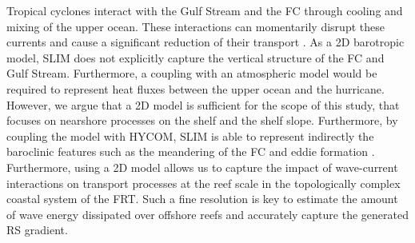 Tropical cyclones interact with the Gulf Stream and the FC through cooling and mixing of the upper ocean. These interactions can momentarily disrupt these currents and cause a significant reduction of their transport \citep{oey2007hurricane,ezer2017observations,ezer2020long}. As a 2D barotropic model, SLIM does not explicitly capture the vertical structure of the FC and Gulf Stream. Furthermore, a coupling with an atmospheric model would be required to represent heat fluxes between the upper ocean and the hurricane. However, we argue that a 2D model is sufficient for the scope of this study, that focuses on nearshore processes on the shelf and the shelf slope. Furthermore, by coupling the model with HYCOM, SLIM is able to represent indirectly the baroclinic features such as the meandering of the FC and eddie formation \citep{frys2020fine}. Furthermore, using a 2D model allows us to capture the impact of wave-current interactions on transport processes at the reef scale in the topologically complex coastal system of the FRT. Such a fine resolution is key to estimate the amount of wave energy dissipated over offshore reefs and accurately capture the generated RS gradient.


